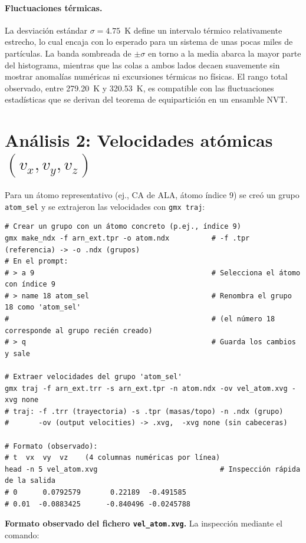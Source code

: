 \documentclass[12pt,a4paper]{article}
\begin{document}
\paragraph{Fluctuaciones térmicas.}
La desviación estándar $\sigma = 4.75$~K define un intervalo térmico relativamente estrecho, lo cual encaja con lo esperado para un sistema de unas pocas miles de partículas. La banda sombreada de $\pm\sigma$ en torno a la media abarca la mayor parte del histograma, mientras que las colas a ambos lados decaen suavemente sin mostrar anomalías numéricas ni excursiones térmicas no físicas. El rango total observado, entre 279.20~K y 320.53~K, es compatible con las fluctuaciones estadísticas que se derivan del teorema de equipartición en un ensamble NVT.

\section{Análisis 2: Velocidades atómicas \texorpdfstring{$(v_x, v_y, v_z)$}{(vx, vy, vz)}}
Para un átomo representativo (ej., CA de ALA, átomo índice 9) se creó un grupo \texttt{atom\_sel} y se extrajeron las velocidades con \texttt{gmx traj}:

\begin{lstlisting}[style=bashstyle,texcl=false]
# Crear un grupo con un átomo concreto (p.ej., índice 9)
gmx make_ndx -f arn_ext.tpr -o atom.ndx          # -f .tpr (referencia) -> -o .ndx (grupos)
# En el prompt:
# > a 9                                          # Selecciona el átomo con índice 9
# > name 18 atom_sel                             # Renombra el grupo 18 como 'atom_sel'
#                                                # (el número 18 corresponde al grupo recién creado)
# > q                                            # Guarda los cambios y sale

# Extraer velocidades del grupo 'atom_sel'
gmx traj -f arn_ext.trr -s arn_ext.tpr -n atom.ndx -ov vel_atom.xvg -xvg none
# traj: -f .trr (trayectoria) -s .tpr (masas/topo) -n .ndx (grupo)
#       -ov (output velocities) -> .xvg,  -xvg none (sin cabeceras)

# Formato (observado):
# t  vx  vy  vz    (4 columnas numéricas por línea)
head -n 5 vel_atom.xvg                             # Inspección rápida de la salida
# 0      0.0792579       0.22189  -0.491585
# 0.01  -0.0883425      -0.840496 -0.0245788
\end{lstlisting}

\noindent\textbf{Formato observado del fichero \texttt{vel\_atom.xvg}.}
La inspección mediante el comando:
\end{document}
